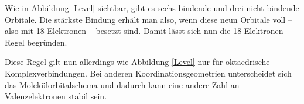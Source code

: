 Wie in Abbildung \ref{Level} sichtbar, gibt es sechs bindende und drei nicht bindende Orbitale. Die stärkste Bindung erhält man also, wenn diese neun Orbitale voll -- also mit 18 Elektronen -- besetzt sind. Damit lässt sich nun die 18-Elektronen-Regel begründen. 

Diese Regel gilt nun allerdings wie Abbildung \ref{Level}  nur für oktaedrische Komplexverbindungen. Bei anderen Koordinationsgeometrien unterscheidet sich das Molekülorbitalschema und dadurch kann eine andere Zahl an Valenzelektronen stabil sein.


